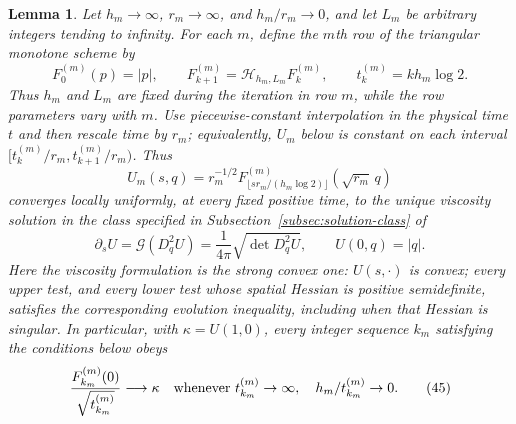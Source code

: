 \documentclass[11pt,reqno]{amsart}
\theoremstyle{plain}
\newtheorem{lemma}[theorem]{Lemma}
\theoremstyle{definition}
\theoremstyle{remark}
\numberwithin{equation}{section}
\newcommand{\1}{\mathbf 1}
\begin{document}
\begin{lemma}\label{lem:viscosity-limit}
Let $h_ m\to\infty$, $r_ m\to\infty$, and $h_ m/r_ m\to0$, and let
$L_ m$ be arbitrary integers tending to infinity.  For each $m$, define the
$m$th row of the triangular monotone scheme by
\begin{equation}
F_0^{(m)}(p)=|p|,\qquad
F_{k+1}^{(m)}=\mathcal H_{h_m,L_m}F_k^{(m)},
\qquad t_k^{(m)}=k h_m\log2.
\tag{42}
\end{equation}
Thus $h_m$ and $L_m$ are fixed during the iteration in row $m$, while the
row parameters vary with $m$.  Use piecewise-constant interpolation in the
physical time $t$ and then rescale time by $r_m$; equivalently, $U_m$ below is
constant on each interval
$[t_k^{(m)}/r_m,t_{k+1}^{(m)}/r_m)$.  Thus
\begin{equation}
U_ m(s,q)=r_ m^{-1/2}F_{\lfloor sr_ m/(h_ m\log2)\rfloor}^{(m)}
(\sqrt{r_ m}\,q)
\tag{43}
\end{equation}
converges locally uniformly, at every fixed positive time, to the unique
viscosity solution in the class specified in
Subsection~\ref{subsec:solution-class} of
\begin{equation}
\partial_ sU=\mathcal G(D_ q^2U)=\frac1{4\pi}\sqrt{\det D_ q^2U},
\qquad U(0,q)=|q|.
\tag{44}
\end{equation}
Here the viscosity formulation is the strong convex one:
$U(s,\cdot)$ is convex; every upper test, and every lower test whose
spatial Hessian is positive semidefinite, satisfies the corresponding
evolution inequality, including when that Hessian is singular.  In
particular, with $\kappa=U(1,0)$, every integer sequence $k_m$ satisfying
the conditions below obeys
\begin{equation}
\frac{F_{k_m}^{(m)}(0)}{\sqrt{t_{k_m}^{(m)}}}\longrightarrow\kappa
\quad\hbox{whenever }t_{k_m}^{(m)}\to\infty,
\quad h_m/t_{k_m}^{(m)}\to0.
\tag{45}
\end{equation}

\end{lemma}
\end{document}
